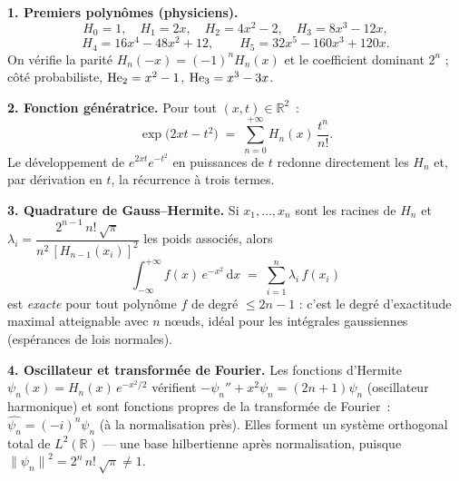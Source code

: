 \decsep{}



\begin{mdframed}[style=exbar]
  \textbf{1. Premiers polynômes (physiciens).}
  \[
    H_0=1,\quad H_1=2x,\quad H_2=4x^2-2,\quad H_3=8x^3-12x,
  \]
  \[
    H_4=16x^4-48x^2+12,\qquad H_5=32x^5-160x^3+120x.
  \]
  On vérifie la parité $H_n(-x)={(-1)}^n H_n(x)$ et le coefficient
  dominant $2^n$ ; côté probabiliste,
  $\mathrm{He}_2=x^2-1$, $\mathrm{He}_3=x^3-3x$.

  \smallskip\noindent
  \textbf{2. Fonction génératrice.}\enspace{}
  Pour tout $(x,t)\in\mathbb{R}^2$~:
  \[
    \exp\!\bigl(2xt-t^2\bigr) \;=\; \sum_{n=0}^{+\infty} H_n(x)\,\frac{t^n}{n!}.
  \]
  Le développement de $e^{2xt}e^{-t^2}$ en puissances de $t$ redonne
  directement les $H_n$ et, par dérivation en $t$, la récurrence à trois
  termes.

  \smallskip\noindent
  \textbf{3. Quadrature de Gauss--Hermite.}\enspace%
  Si $x_1,\ldots,x_n$ sont les racines de $H_n$ et
  $\lambda_i=\dfrac{2^{n-1}\,n!\,\sqrt{\pi}}{n^2\,{[H_{n-1}(x_i)]}^2}$ les
  poids associés, alors
  \[
    \int_{-\infty}^{+\infty} f(x)\,e^{-x^2}\,\mathrm{d}x
    \;=\; \sum_{i=1}^{n}\lambda_i\,f(x_i)
  \]
  est \emph{exacte} pour tout polynôme $f$ de degré $\leq 2n-1$ : c'est le
  degré d'exactitude maximal atteignable avec $n$ nœuds, idéal pour les
  intégrales gaussiennes (espérances de lois normales).

  \smallskip\noindent
  \textbf{4. Oscillateur et transformée de Fourier.}\enspace%
  Les fonctions d'Hermite $\psi_n(x)=H_n(x)\,e^{-x^2/2}$ vérifient
  $-\psi_n''+x^2\psi_n=(2n+1)\psi_n$ (oscillateur harmonique) et sont
  fonctions propres de la transformée de Fourier~:
  $\widehat{\psi_n}={(-i)}^n\psi_n$ (à la normalisation près). Elles
  forment un système orthogonal total de $L^2(\mathbb{R})$ — une base
  hilbertienne après normalisation, puisque
  ${\|\psi_n\|}^2=2^n\,n!\,\sqrt{\pi}\neq 1$.
\end{mdframed}

\vspace{6pt}

